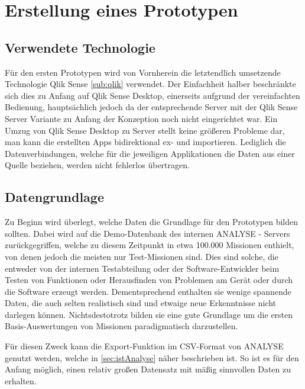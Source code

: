 

\section{Erstellung eines Prototypen}
\label{sec:erstellungPrototyp}
\subsection{Verwendete Technologie}
\label{sub:verweTech}
Für den ersten Prototypen wird von Vornherein die letztendlich umsetzende Technologie Qlik Sense \ref{sub:qlik} verwendet. 
Der Einfachheit halber beschränkte sich dies zu Anfang auf Qlik Sense Desktop, einerseits aufgrund der vereinfachten Bedienung, hauptsächlich jedoch da der entsprechende Server mit der Qlik Sense Server Variante zu Anfang der Konzeption noch nicht eingerichtet war. 
Ein Umzug von Qlik Sense Desktop zu Server stellt keine größeren Probleme dar, man kann die erstellten Apps bidirektional ex- und importieren. 
Lediglich die Datenverbindungen, welche für die jeweiligen Applikationen die Daten aus einer Quelle beziehen, werden nicht fehlerlos übertragen.

\subsection{Datengrundlage}
\label{sub:datengrundlage}
Zu Beginn wird überlegt, welche Daten die Grundlage für den Prototypen bilden sollten.
Dabei wird auf die Demo-Datenbank des internen \gls{ANALYSE} - Servers zurückgegriffen, welche zu diesem Zeitpunkt in etwa 100.000 Missionen enthielt, von denen jedoch die meisten nur Test-Missionen sind. 
Dies sind solche, die entweder von der internen Testabteilung oder der Software-Entwickler beim Testen von Funktionen oder Herausfinden von Problemen am Gerät oder durch die Software erzeugt werden. 
Dementsprechend enthalten sie wenige spannende Daten, die auch selten realistisch sind und etwaige neue Erkenntnisse nicht darlegen können. 
Nichtsdestotrotz bilden sie eine gute Grundlage um die ersten Basis-Auswertungen von Missionen paradigmatisch darzustellen. 

Für diesen Zweck kann die Export-Funktion im CSV-Format von \gls{ANALYSE} genutzt werden, welche in  \ref{sec:istAnalyse} näher beschrieben ist. 
So ist es für den Anfang möglich, einen relativ großen Datensatz mit mäßig sinnvollen Daten zu erhalten.%



